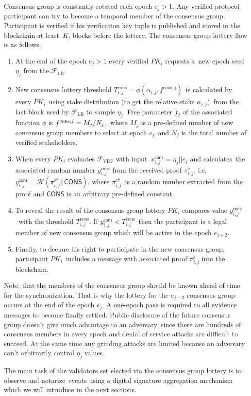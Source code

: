 Consensus group is constantly rotated each epoch ${e_j \gt 1}$.
Any verified protocol participant can try to become a temporal member of the consensus group.
Participant is verified if his verification key tuple is published and stored in the blockchain at least\
$K_{\text{f}}$ blocks before the lottery.
The consensus group lottery flow is as follows:
\begin{enumerate}
    \item At the end of the epoch ${e_j \gt 1}$ every verified $PK_i$ requests a\
    new epoch seed $\eta_j$ from the ${\mathcal{F}}_{\text{LB}}$.
    \item New consensus lottery threshold $T_{i, j}^{\text{cons}} = \phi(\alpha_{i, j}, f^{\text{cons}, j})$\
    is calculated by every $PK_i$\ using stake distribution (to get the relative stake $\alpha_{i, j}$)\
    from the last block used by ${\mathcal{F}}_{\text{LB}}$ to sample $\eta_j$.
    Free parameter $f_j$ of the associated function $\phi$ is ${f^{\text{cons}, j} = M_j /\/ N_j}$,\
    where $M_j$ is a pre-defined number of new consensus group members to select at epoch $e_j$\
    and $N_j$ is the total number of verified stakeholders.
    \item When every $PK_i$ evaluates ${\mathcal{F}}_{\text{VRF}}$ with input\
    $x_{i, j}^{\textsf{cons}} = \eta_j || e_j $ and calculates\
    the associated random number $y_{i, j}^{\textsf{cons}}$ from the received proof $\pi_{i, j}^{\text{e}}$, i.e.\
    ${y_{i, j}^{\textsf{cons}} = \mathcal{H}(\pi_{i, j}^{\text{e}*}||\textsf{CONS})}$, where $\pi_{i, j}^{\text{e}*}$\
    is a random number extracted from the proof and $\textsf{CONS}$ is an arbitrary pre-defined constant.
    \item To reveal the result of the consensus group lottery $PK_i$ compares value $y_{i, j}^{\textsf{cons}}$\
    with the threshold $T_{i, j}^{\text{cons}}$.
    If ${y_{i, j}^{\textsf{cons}} < T_{i, j}^{\text{cons}}}$\
    then the participant is a legal member of new consensus group which will be active in the epoch $e_{j+2}$.
    \item Finally, to declare his right to participate in the new consensus group, participant $PK_i$\
    includes a message with associated proof $\pi_{i, j}^{\text{e}}$ into the blockchain.
\end{enumerate}
Note, that the members of the consensus group should be known ahead of time for the synchronization.
That is why the lottery for the $e_{j + 2}$ consensus group occurs at the end of the epoch $e_j$.
A one-epoch pass is required to all evidence messages to become finally settled.
Public disclosure of the future consensus group doesn't give much advantage to an adversary\
since there are hundreds of consensus members in every epoch and denial of service attacks are difficult to succeed.
At the same time any grinding attacks are limited because an adversary can't arbitrarily control $\eta_j$ values.

The main task of the validators set elected via the consensus group lottery is to observe and notarize\
events using a digital signature aggregation mechanism which we will introduce in the next sections.

